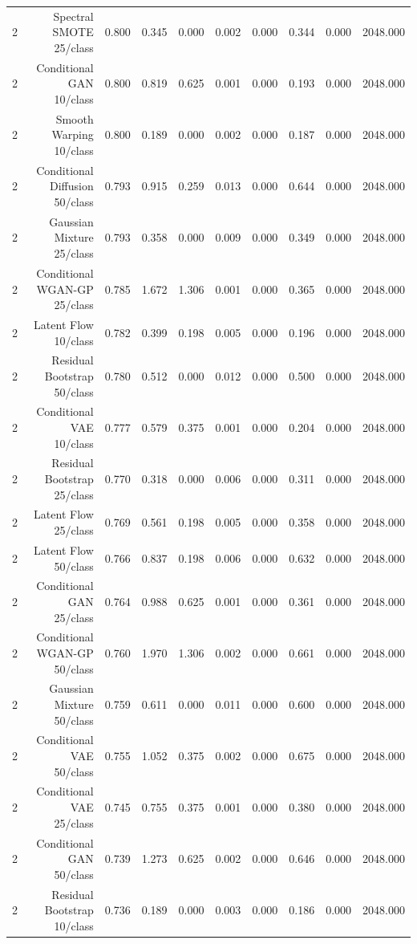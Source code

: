 \begin{table}[t]
\begin{tabular}{lrrrrrrrrr}
2 & Spectral SMOTE 25/class & 0.800 & 0.345 & 0.000 & 0.002 & 0.000 & 0.344 & 0.000 & 2048.000 \\
2 & Conditional GAN 10/class & 0.800 & 0.819 & 0.625 & 0.001 & 0.000 & 0.193 & 0.000 & 2048.000 \\
2 & Smooth Warping 10/class & 0.800 & 0.189 & 0.000 & 0.002 & 0.000 & 0.187 & 0.000 & 2048.000 \\
2 & Conditional Diffusion 50/class & 0.793 & 0.915 & 0.259 & 0.013 & 0.000 & 0.644 & 0.000 & 2048.000 \\
2 & Gaussian Mixture 25/class & 0.793 & 0.358 & 0.000 & 0.009 & 0.000 & 0.349 & 0.000 & 2048.000 \\
2 & Conditional WGAN-GP 25/class & 0.785 & 1.672 & 1.306 & 0.001 & 0.000 & 0.365 & 0.000 & 2048.000 \\
2 & Latent Flow 10/class & 0.782 & 0.399 & 0.198 & 0.005 & 0.000 & 0.196 & 0.000 & 2048.000 \\
2 & Residual Bootstrap 50/class & 0.780 & 0.512 & 0.000 & 0.012 & 0.000 & 0.500 & 0.000 & 2048.000 \\
2 & Conditional VAE 10/class & 0.777 & 0.579 & 0.375 & 0.001 & 0.000 & 0.204 & 0.000 & 2048.000 \\
2 & Residual Bootstrap 25/class & 0.770 & 0.318 & 0.000 & 0.006 & 0.000 & 0.311 & 0.000 & 2048.000 \\
2 & Latent Flow 25/class & 0.769 & 0.561 & 0.198 & 0.005 & 0.000 & 0.358 & 0.000 & 2048.000 \\
2 & Latent Flow 50/class & 0.766 & 0.837 & 0.198 & 0.006 & 0.000 & 0.632 & 0.000 & 2048.000 \\
2 & Conditional GAN 25/class & 0.764 & 0.988 & 0.625 & 0.001 & 0.000 & 0.361 & 0.000 & 2048.000 \\
2 & Conditional WGAN-GP 50/class & 0.760 & 1.970 & 1.306 & 0.002 & 0.000 & 0.661 & 0.000 & 2048.000 \\
2 & Gaussian Mixture 50/class & 0.759 & 0.611 & 0.000 & 0.011 & 0.000 & 0.600 & 0.000 & 2048.000 \\
2 & Conditional VAE 50/class & 0.755 & 1.052 & 0.375 & 0.002 & 0.000 & 0.675 & 0.000 & 2048.000 \\
2 & Conditional VAE 25/class & 0.745 & 0.755 & 0.375 & 0.001 & 0.000 & 0.380 & 0.000 & 2048.000 \\
2 & Conditional GAN 50/class & 0.739 & 1.273 & 0.625 & 0.002 & 0.000 & 0.646 & 0.000 & 2048.000 \\
2 & Residual Bootstrap 10/class & 0.736 & 0.189 & 0.000 & 0.003 & 0.000 & 0.186 & 0.000 & 2048.000 \\

\end{tabular}
\end{table}
